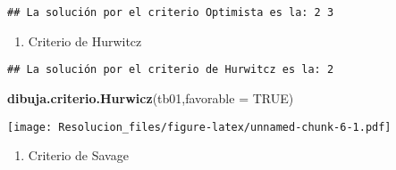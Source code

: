 \documentclass[
]{article}
\newenvironment{Shaded}{\begin{snugshade}}{\end{snugshade}}
\newcommand{\AttributeTok}[1]{\textcolor[rgb]{0.13,0.29,0.53}{#1}}
\newcommand{\ConstantTok}[1]{\textcolor[rgb]{0.56,0.35,0.01}{#1}}
\newcommand{\FunctionTok}[1]{\textcolor[rgb]{0.13,0.29,0.53}{\textbf{#1}}}
\newcommand{\NormalTok}[1]{#1}
\newcommand{\OtherTok}[1]{\textcolor[rgb]{0.56,0.35,0.01}{#1}}
\newcommand{\SpecialCharTok}[1]{\textcolor[rgb]{0.81,0.36,0.00}{\textbf{#1}}}
\newcommand{\StringTok}[1]{\textcolor[rgb]{0.31,0.60,0.02}{#1}}
\providecommand{\tightlist}{%
  \setlength{\itemsep}{0pt}\setlength{\parskip}{0pt}}
\begin{document}
\begin{verbatim}
## La solución por el criterio Optimista es la: 2 3
\end{verbatim}

\begin{enumerate}
\def\labelenumi{\arabic{enumi}.}
\setcounter{enumi}{2}
\tightlist
\item
  Criterio de Hurwitcz
\end{enumerate}

\begin{Shaded}
\end{Shaded}

\begin{verbatim}
## La solución por el criterio de Hurwitcz es la: 2
\end{verbatim}

\begin{Shaded}
\begin{Highlighting}[]
\FunctionTok{dibuja.criterio.Hurwicz}\NormalTok{(tb01,}\AttributeTok{favorable =} \ConstantTok{TRUE}\NormalTok{)}
\end{Highlighting}
\end{Shaded}

\texttt{[image: Resolucion\_files/figure-latex/unnamed-chunk-6-1.pdf]}

\begin{enumerate}
\def\labelenumi{\arabic{enumi}.}
\setcounter{enumi}{3}
\tightlist
\item
  Criterio de Savage
\end{enumerate}

\begin{Shaded}
\end{Shaded}
\end{document}
